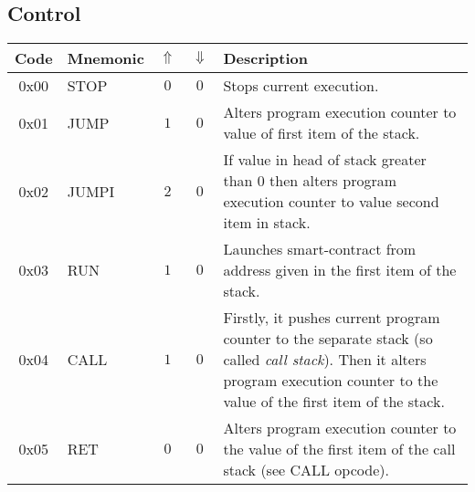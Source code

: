 \documentclass[12pt,a4paper]{article}
\begin{document}
\subsection{Control}
\begin{tabularx}{\textwidth}{ c l c c p{7cm} }
\textbf{Code} & \textbf{Mnemonic} & \textbf{$\Uparrow$} & \textbf{$\Downarrow$} & \textbf{Description} \\
\hline
0x00 & STOP & $0$ & $0$ & Stops current execution. \\
\hline
0x01 & JUMP & $1$ & $0$ & Alters program execution counter to value of first item of the stack. \\
\hline
0x02 & JUMPI & $2$ & $0$ & If value in head of stack greater than 0 then alters program execution counter to value second item in stack.  \\
\hline
0x03 & RUN & $1$ & $0$ & Launches smart-contract from address given in the first item of the stack.  \\
\hline
0x04 & CALL & $1$ & $0$ & Firstly, it pushes current program counter to the separate stack (so called \emph{call stack}). Then it alters program execution counter to the value of the first item of the stack.  \\
\hline
0x05 & RET & $0$ & $0$ & Alters program execution counter to the value of the first item of the call stack (see CALL opcode).  \\

\end{tabularx}
\end{document}
